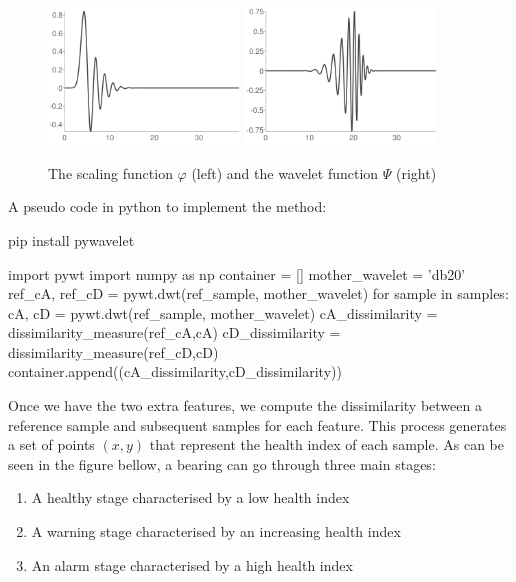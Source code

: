 \documentclass[11pt, oneside]{article}   	%
\begin{document}
\begin{figure}[H] %
   \centering
   \includegraphics[width=2in]{dbscaling}
    \includegraphics[width=2in]{dbwavelet}  
   \caption{The scaling function $\varphi$ (left) and the wavelet function $\Psi$ (right) }
   \label{fig:example}
\end{figure}

 A pseudo code in python to implement the method:
\begin{python}
pip install pywavelet
\end{python}
\begin{python}
import pywt
import numpy as np
container = []
mother_wavelet = 'db20'
ref_cA, ref_cD = pywt.dwt(ref_sample, mother_wavelet)
for sample in samples:
	cA, cD = pywt.dwt(ref_sample, mother_wavelet)
	cA_dissimilarity = dissimilarity_measure(ref_cA,cA)
	cD_dissimilarity = dissimilarity_measure(ref_cD,cD)
	container.append((cA_dissimilarity,cD_dissimilarity))
\end{python}
\begin{flushleft}
Once we have the two extra features, we compute the dissimilarity between a reference sample and subsequent samples for each feature. 
This process generates a set of points $(x,y)$ that represent the health index of each sample. As can be seen in the figure bellow, a bearing can go through three main stages:
\begin{enumerate}
\item A healthy stage characterised by a low health index
\item A warning stage characterised by an increasing health index
\item An alarm stage characterised by a high health index
\end{enumerate}

\end{flushleft}
\end{document}
